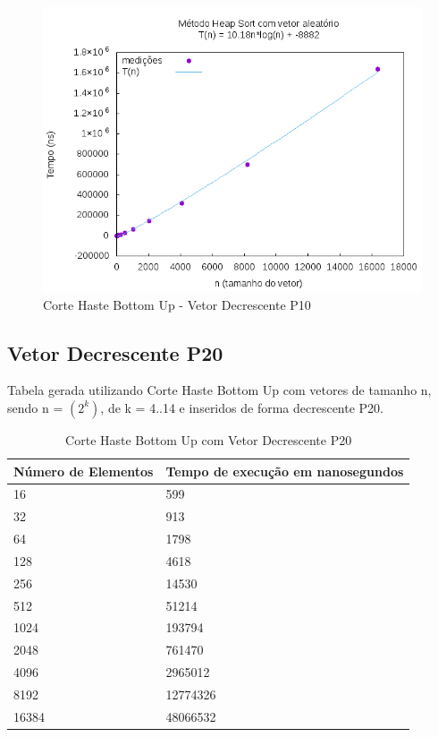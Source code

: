 \documentclass[12pt,a4paper,twoside]{report}
\begin{document}
\begin{figure}[H]
    \centering
    \includegraphics[width=0.7\linewidth]{graficos/HeapSort/vIntAleatorio/vIntAleatorio.png}
  \caption{Corte Haste Bottom Up - Vetor Decrescente P10}
\end{figure}




\subsection{Vetor Decrescente P20}
Tabela gerada utilizando Corte Haste Bottom Up com vetores de tamanho n, sendo n = $(2^k)$, de k = 4..14 e inseridos de forma decrescente P20.
\begin{table}[H]
\centering
\caption{Corte Haste Bottom Up com Vetor Decrescente P20}
\label{my-label}
\begin{tabular}{|l|l|}
\hline
\multicolumn{1}{|c|}{\textbf{Número de Elementos}} & \multicolumn{1}{c|}{\textbf{Tempo de execução em nanosegundos}} \\ \hline
16 & 599 \\ \hline
32 & 913 \\ \hline
64 & 1798 \\ \hline
128 & 4618 \\ \hline
256 & 14530 \\ \hline
512 & 51214 \\ \hline
1024 & 193794 \\ \hline
2048 & 761470 \\ \hline
4096 & 2965012 \\ \hline
8192 & 12774326 \\ \hline
16384 & 48066532 \\ \hline
\end{tabular}
\end{table}
\end{document}
